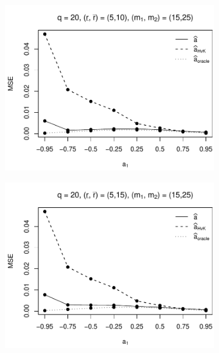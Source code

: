 \begin{figure}[p]
\begin{subfigure}[b]{0.45\textwidth}
\includegraphics[width=\textwidth]{Plots/Plots_Supplement/MSE_a_T=500_slope=10_(L1,L2,K1,K2,M1,M2)=(20,20,5,10,15,25).pdf}
\end{subfigure}
\hspace{0.25cm}
\begin{subfigure}[b]{0.45\textwidth}
\includegraphics[width=\textwidth]{Plots/Plots_Supplement/MSE_a_T=500_slope=10_(L1,L2,K1,K2,M1,M2)=(20,20,5,15,15,25).pdf}
\end{subfigure}


\end{figure}
